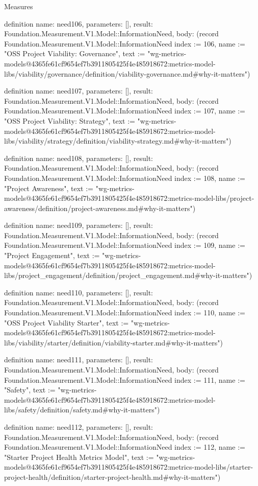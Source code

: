 \begin{lexlean}{Measures}
\begin{semanticmodule}
definition{
  name: need106,
  parameters: [],
  result: Foundation.Measurement.V1.Model::InformationNeed,
  body: (record Foundation.Measurement.V1.Model::InformationNeed {index := 106, name := "OSS Project Viability: Governance", text := "wg-metrics-models@4365fe61cf9654ef7b3911805425f4e485918672:metrics-model-libs/viability/governance/definition/viability-governance.md#why-it-matters"})
}

definition{
  name: need107,
  parameters: [],
  result: Foundation.Measurement.V1.Model::InformationNeed,
  body: (record Foundation.Measurement.V1.Model::InformationNeed {index := 107, name := "OSS Project Viability: Strategy", text := "wg-metrics-models@4365fe61cf9654ef7b3911805425f4e485918672:metrics-model-libs/viability/strategy/definition/viability-strategy.md#why-it-matters"})
}

definition{
  name: need108,
  parameters: [],
  result: Foundation.Measurement.V1.Model::InformationNeed,
  body: (record Foundation.Measurement.V1.Model::InformationNeed {index := 108, name := "Project Awareness", text := "wg-metrics-models@4365fe61cf9654ef7b3911805425f4e485918672:metrics-model-libs/project-awareness/definition/project-awareness.md#why-it-matters"})
}

definition{
  name: need109,
  parameters: [],
  result: Foundation.Measurement.V1.Model::InformationNeed,
  body: (record Foundation.Measurement.V1.Model::InformationNeed {index := 109, name := "Project Engagement", text := "wg-metrics-models@4365fe61cf9654ef7b3911805425f4e485918672:metrics-model-libs/project_engagement/definition/project_engagement.md#why-it-matters"})
}

definition{
  name: need110,
  parameters: [],
  result: Foundation.Measurement.V1.Model::InformationNeed,
  body: (record Foundation.Measurement.V1.Model::InformationNeed {index := 110, name := "OSS Project Viability Starter", text := "wg-metrics-models@4365fe61cf9654ef7b3911805425f4e485918672:metrics-model-libs/viability/starter/definition/viability-starter.md#why-it-matters"})
}

definition{
  name: need111,
  parameters: [],
  result: Foundation.Measurement.V1.Model::InformationNeed,
  body: (record Foundation.Measurement.V1.Model::InformationNeed {index := 111, name := "Safety", text := "wg-metrics-models@4365fe61cf9654ef7b3911805425f4e485918672:metrics-model-libs/safety/definition/safety.md#why-it-matters"})
}

definition{
  name: need112,
  parameters: [],
  result: Foundation.Measurement.V1.Model::InformationNeed,
  body: (record Foundation.Measurement.V1.Model::InformationNeed {index := 112, name := "Starter Project Health Metrics Model", text := "wg-metrics-models@4365fe61cf9654ef7b3911805425f4e485918672:metrics-model-libs/starter-project-health/definition/starter-project-health.md#why-it-matters"})
}


\end{semanticmodule}
\end{lexlean}
